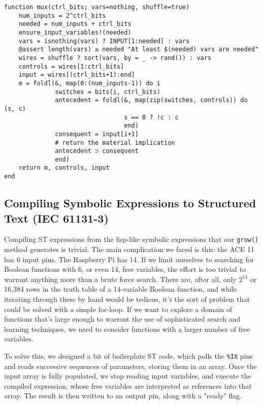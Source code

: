 \documentclass[11pt]{article}
\begin{document}
\begin{verbatim}
function mux(ctrl_bits; vars=nothing, shuffle=true)
    num_inputs = 2^ctrl_bits
    needed = num_inputs + ctrl_bits
    ensure_input_variables!(needed)
    vars = isnothing(vars) ? INPUT[1:needed] : vars
    @assert length(vars) ≥ needed "At least $(needed) vars are needed"
    wires = shuffle ? sort(vars, by = _ -> rand()) : vars
    controls = wires[1:ctrl_bits]
    input = wires[(ctrl_bits+1):end]
    m = foldl(&, map(0:(num_inputs-1)) do i
              switches = bits(i, ctrl_bits)
              antecedent = foldl(&, map(zip(switches, controls)) do (s, c)
                                 s == 0 ? !c : c
                                 end)
              consequent = input[i+1]
              # return the material implication
              antecedent ⊃ consequent 
              end)
    return m, controls, input
end
\end{verbatim}

\subsection{Compiling Symbolic Expressions to Structured Text (IEC 61131-3)}
\label{sec:orgc5ad49c}



Compiling ST expressions from the lisp-like symbolic expressions that our \texttt{grow()} method generates is trivial. The main complication we faced is this: the ACE 11 has 6 input pins. The Raspberry Pi has 14. If we limit ourselves to searching for Boolean functions with 6, or even 14, free variables, the effort is too trivial to warrant anything more than a brute force search. There are, after all, only \(2^14\) or 16,384 rows in the truth table of a 14-variable Boolean function, and while iterating through these by hand would be tedious, it's the sort of problem that could be solved with a simple for-loop. If we want to explore a domain of functions that's large enough to warrant the use of sophisticated search and learning techniques, we need to consider functions with a larger number of free variables.

To solve this, we designed a bit of boilerplate ST code, which polls the \texttt{\%IX} pins and reads successive sequences of parameters, storing them in an array. Once the input array is fully populated, we stop reading input variables, and execute the compiled expression, whose free variables are interpreted as references into that array. The result is then written to an output pin, along with a "ready" flag.
\end{document}
